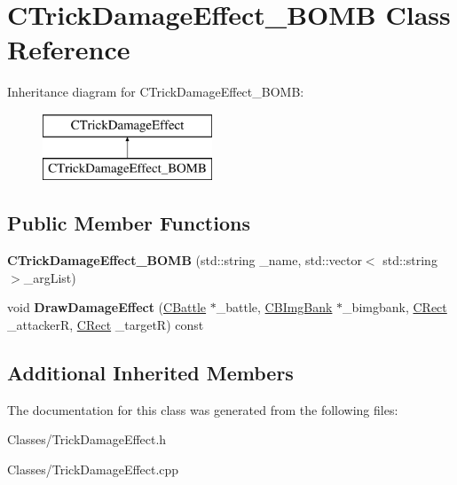 \hypertarget{class_c_trick_damage_effect___b_o_m_b}{}\section{C\+Trick\+Damage\+Effect\+\_\+\+B\+O\+MB Class Reference}
\label{class_c_trick_damage_effect___b_o_m_b}
Inheritance diagram for C\+Trick\+Damage\+Effect\+\_\+\+B\+O\+MB\+:\begin{figure}[H]
\begin{center}
\leavevmode
\includegraphics[height=2.000000cm]{class_c_trick_damage_effect___b_o_m_b}
\end{center}
\end{figure}
\subsection*{Public Member Functions}
\begin{DoxyCompactItemize}
\item 
{\bfseries C\+Trick\+Damage\+Effect\+\_\+\+B\+O\+MB} (std\+::string \+\_\+name, std\+::vector$<$ std\+::string $>$\+\_\+arg\+List)\hypertarget{class_c_trick_damage_effect___b_o_m_b_a66e2cc8b04b3f9dcbcdf3bd0ae4cc25d}{}\label{class_c_trick_damage_effect___b_o_m_b_a66e2cc8b04b3f9dcbcdf3bd0ae4cc25d}

\item 
void {\bfseries Draw\+Damage\+Effect} (\hyperlink{class_c_battle}{C\+Battle} $\ast$\+\_\+battle, \hyperlink{class_c_b_img_bank}{C\+B\+Img\+Bank} $\ast$\+\_\+bimgbank, \hyperlink{class_c_rect}{C\+Rect} \+\_\+attackerR, \hyperlink{class_c_rect}{C\+Rect} \+\_\+targetR) const \hypertarget{class_c_trick_damage_effect___b_o_m_b_a41bf6b8d8996188a5ee422482df85e39}{}\label{class_c_trick_damage_effect___b_o_m_b_a41bf6b8d8996188a5ee422482df85e39}

\end{DoxyCompactItemize}
\subsection*{Additional Inherited Members}


The documentation for this class was generated from the following files\+:\begin{DoxyCompactItemize}
\item 
Classes/Trick\+Damage\+Effect.\+h\item 
Classes/Trick\+Damage\+Effect.\+cpp\end{DoxyCompactItemize}
